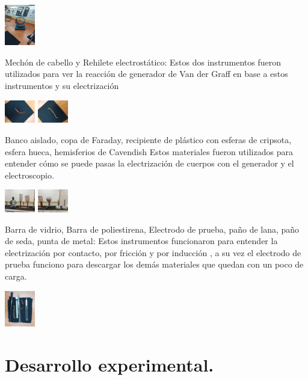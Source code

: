 \documentclass[10pt]{article}
\begin{document}
\begin{multicols}{2}
\includegraphics[width=0.1\textwidth]{Metro}

Mechón de cabello y Rehilete electrostático: 
Estos dos instrumentos fueron utilizados para ver la reacción de generador de Van der Graff en base a estos instrumentos y su electrización 

\includegraphics[width=0.1\textwidth]{Pelo}
\includegraphics[width=0.1\textwidth]{Rehilete}


Banco aislado, copa de Faraday, recipiente de plástico con esferas de cripsota, esfera hueca, hemisferios de Cavendish
Estos materiales fueron utilizados para entender cómo se puede pasas la electrización de cuerpos con el generador y el electroscopio.

\includegraphics[width=0.1\textwidth]{copas}
\includegraphics[width=0.1\textwidth]{bolas}

Barra de vidrio, Barra de poliestirena, Electrodo de prueba, paño de lana, paño de seda, punta de metal:
Estos instrumentos funcionaron para entender la electrización por contacto, por fricción y por inducción , a su vez el electrodo de prueba funciono para descargar los demás materiales que quedan con un poco de carga. 

\includegraphics[width=0.1\textwidth]{Herramientas}
\section{Desarrollo experimental.}


\end{multicols}
\end{document}
